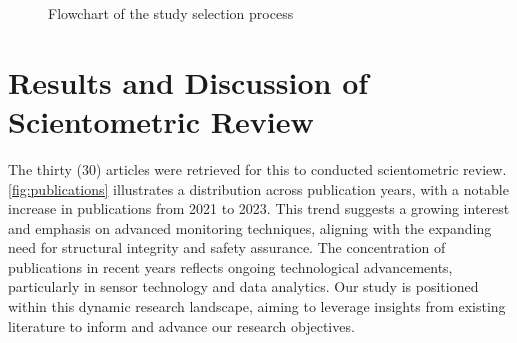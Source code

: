 \documentclass[journal, a4paper]{IEEEtran}
\begin{document}
\begin{figure}[h]
  
    \centering
{}
\caption{Flowchart of the study selection process}
\label{fig:flowchartFilter}
\end{figure}





\section{Results and Discussion of Scientometric Review}
The thirty (30) articles were retrieved for this to conducted scientometric review.
\autoref{fig:publications} illustrates a distribution across publication years, with a notable increase in publications
from 2021 to 2023.
This trend suggests a growing interest and emphasis on advanced monitoring techniques,
aligning with the expanding need for structural integrity and safety assurance.
The concentration of publications in recent years reflects ongoing technological advancements,
particularly in sensor technology and data analytics.
Our study is positioned within this dynamic research landscape, aiming to leverage insights from existing
literature to inform and advance our research objectives.
\end{document}
